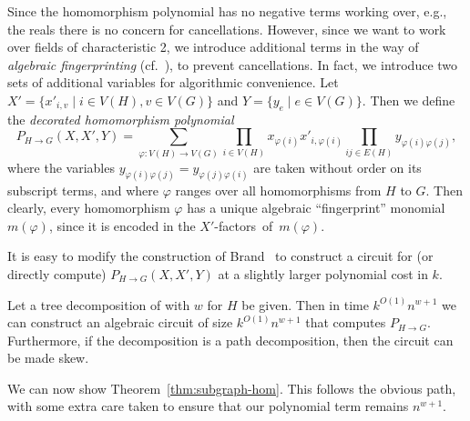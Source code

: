 \documentclass{theoretics}
\begin{document}
Since the homomorphism polynomial has no negative terms working over,
e.g., the reals there is no concern for cancellations. However, since
we want to work over fields of characteristic 2, we introduce
additional terms in the way of \emph{algebraic fingerprinting}
(cf.~\cite{KoutisW16CACM}), to prevent cancellations.
In fact, we introduce two sets of additional variables for algorithmic
convenience. Let $X'=\{x'_{i,v} \mid i \in V(H), v \in V(G)\}$
and $Y=\{y_e \mid e \in V(G)\}$. Then we define
the \emph{decorated homomorphism polynomial}
\[
  P_{H \to G}(X,X',Y) = \sum_{\varphi \colon V(H) \to V(G)}
  \prod_{i \in V(H)} x_{\varphi(i)} x'_{i,\varphi(i)} 
  \prod_{ij \in E(H)} y_{\varphi(i)\varphi(j)},
\]
where the variables $y_{\varphi(i)\varphi(j)}=y_{\varphi(j)\varphi(i)}$
are taken without order on its subscript terms,
and where $\varphi$ ranges over all homomorphisms from $H$ to $G$. 
Then clearly, every homomorphism $\varphi$ has a unique algebraic
``fingerprint'' monomial $m(\varphi)$,  since it is encoded in the
$X'$-factors~of~$m(\varphi)$.

It is easy to modify the construction of Brand~\cite[Section~4.6.1]{Brand19thesis}
to construct a circuit for (or directly compute) $P_{H \to G}(X,X',Y)$
at a slightly larger polynomial cost in $k$.

\begin{proposition}
  Let a tree decomposition of with $w$ for $H$ be given. Then in time
  $k^{O(1)}n^{w+1}$ we can construct an algebraic circuit of size
  $k^{O(1)}n^{w+1}$ that computes $P_{H \to G}$. Furthermore, if the
  decomposition is a path decomposition, then the circuit can be made
  skew.   
\end{proposition}

We can now show Theorem~\ref{thm:subgraph-hom}. This follows the
obvious path, with some extra care taken to ensure that our polynomial
term remains $n^{w+1}$.
\end{document}
